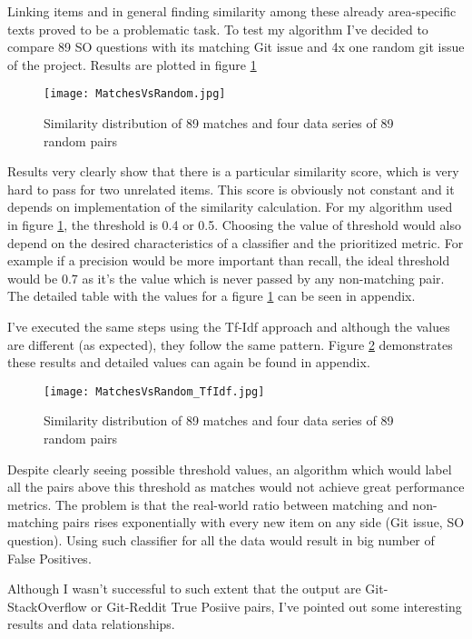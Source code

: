 Linking items and in general finding similarity among these already area-specific texts proved to be a problematic task. To test my algorithm I've decided to compare 89 SO questions with its matching Git issue and 4x one random git issue of the project. Results are plotted in figure \ref{fig:MatchesVsRandom}

\begin{figure}[H]%
    \centering
	\texttt{[image: MatchesVsRandom.jpg]}
    \caption{Similarity distribution of 89 matches and four data series of 89 random pairs}%
    \label{fig:MatchesVsRandom}%
\end{figure}


Results very clearly show that there is a particular similarity score, which is very hard to pass for two unrelated items. This score is obviously not constant and it depends on implementation of the similarity calculation. For my algorithm used in figure \ref{fig:MatchesVsRandom}, the threshold is 0.4 or 0.5. Choosing the value of threshold would also depend on the  desired characteristics of a classifier and the prioritized metric. For example if a precision would be more important than recall, the ideal threshold would be 0.7 as it's the value which is never passed by any non-matching pair. The detailed table with the values for a figure \ref{fig:MatchesVsRandom} can be seen in appendix.

I've executed the same steps using the Tf-Idf approach and although the values are different (as expected), they follow the same pattern. Figure \ref{fig:MatchesVsRandom_TfIdf} demonstrates these results and detailed values can again be found in appendix.

\begin{figure}[H]%
    \centering
	\texttt{[image: MatchesVsRandom\_TfIdf.jpg]}
    \caption{Similarity distribution of 89 matches and four data series of 89 random pairs}%
    \label{fig:MatchesVsRandom_TfIdf}%
\end{figure}


Despite clearly seeing possible threshold values, an algorithm which would label all the pairs above this threshold as matches would not achieve great performance metrics. The problem is that the real-world ratio between matching and non-matching pairs rises exponentially with every new item on any side (Git issue, SO question). Using such classifier for all the data would result in big number of False Positives.


Although I wasn't successful to such extent that the output are Git-StackOverflow or Git-Reddit True Posiive pairs, I've pointed out some interesting results and data relationships.

